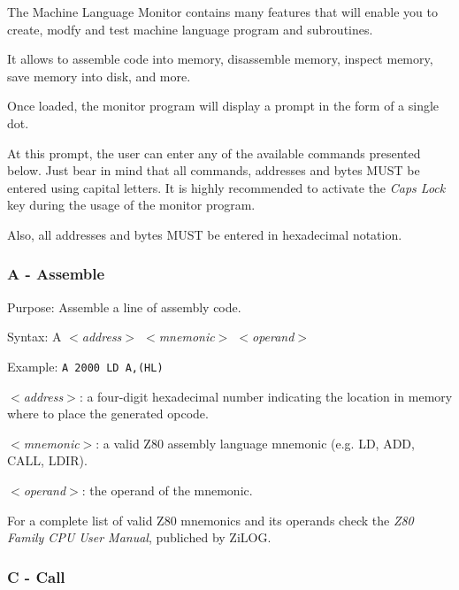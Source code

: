     The Machine Language Monitor contains many features that will enable you to
    create, modfy and test machine language program and subroutines.

    It allows to assemble code into memory, disassemble memory, inspect memory,
    save memory into disk, and more.

    Once loaded, the monitor program will display a prompt in the form of a
    single dot.

    At this prompt, the user can enter any of the available commands presented
    below. Just bear in mind that all commands, addresses and bytes MUST be
    entered using capital letters. It is highly recommended to activate the
    \textit{Caps Lock} key during the usage of the monitor program.

    Also, all addresses and bytes MUST be entered in hexadecimal notation.

        \subsubsection{A - Assemble}

        Purpose: Assemble a line of assembly code.

        Syntax: A \textit{$<$address$>$ $<$mnemonic$>$ $<$operand$>$}

        Example: \texttt{A 2000 LD A,(HL)}

        \hspace{1cm}\textit{$<$address$>$}: a four-digit hexadecimal number indicating
        the location in memory where to place the generated opcode.

        \hspace{1cm}\textit{$<$mnemonic$>$}: a valid Z80 assembly language
        mnemonic (e.g. LD, ADD, CALL, LDIR).

        \hspace{1cm}\textit{$<$operand$>$}: the operand of the mnemonic.

        For a complete list of valid Z80 mnemonics and its operands check the
        \textit{Z80 Family CPU User Manual}\cite{z80manual}, publiched by ZiLOG.

        \subsubsection{C - Call}

